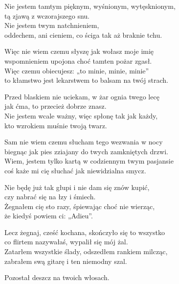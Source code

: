 \begin{text}

    Nie jestem tamtym pięknym, wyśnionym, wytęsknionym,\\
    tą zjawą z wczorajszego snu.\\
    Nie jestem twym natchnieniem,\\
    oddechem, ani cieniem, co ściga tak aż braknie tchu.

    Więc nie wiem czemu słyszę jak wołasz moje imię\\
    wspomnieniem upojona choć tamten pożar zgasł.\\
    Więc czemu obiecujesz: „to minie, minie, minie”\\
    to kłamstwo jest lekarstwem to balsam na twój strach.

    Przed blaskiem nie uciekam, w żar ognia twego lecę\\
    jak ćma, to przecież dobrze znasz.\\
    Nie jestem wcale ważny, więc spłonę tak jak każdy,\\
    kto wzrokiem muśnie twoją twarz.

    Sam nie wiem czemu słucham tego wezwania w nocy\\
    biegnąc jak pies zziajany do twych zamkniętych drzwi.\\
    Wiem, jestem tylko kartą w codziennym twym pasjansie\\
    coś każe mi cię słuchać jak niewidzialna smycz.

    Nie będę już tak głupi i nie dam się znów kupić,\\
    czy nabrać się na łzy i śmiech.\\
    Żegnałem cię sto razy, śpiewając choć nie wierząc,\\
    że kiedyś powiem ci: „Adieu”.

    Lecz żegnaj, cześć kochana, skończyło się to wszystko\\
    co flirtem nazywałaś, wypalił się mój żal.\\
    Zatarłem wszystkie ślady, odszedłem rankiem milcząc,\\
    zabrałem swą gitarę i ten niemodny szal.

    Pozostał deszcz na twoich włosach.
    
\end{text}
\begin{chord}

\end{chord}